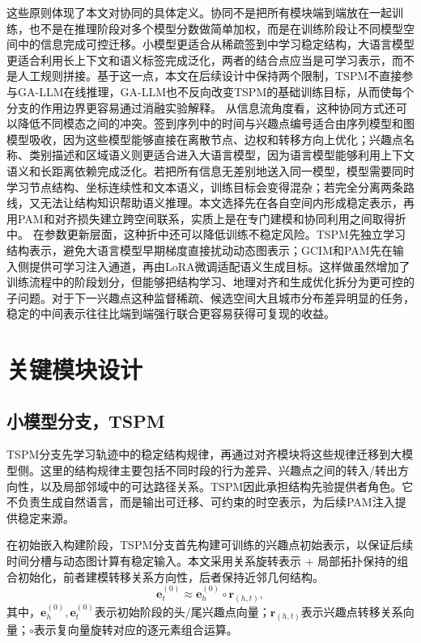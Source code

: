 \par\indent 这些原则体现了本文对协同的具体定义。协同不是把所有模块端到端放在一起训练，也不是在推理阶段对多个模型分数做简单加权，而是在训练阶段让不同模型空间中的信息完成可控迁移。小模型更适合从稀疏签到中学习稳定结构，大语言模型更适合利用长上下文和语义标签完成泛化，两者的结合点应当是可学习表示，而不是人工规则拼接。基于这一点，本文在后续设计中保持两个限制，TSPM不直接参与GA-LLM在线推理，GA-LLM也不反向改变TSPM的基础训练目标，从而使每个分支的作用边界更容易通过消融实验解释。
从信息流角度看，这种协同方式还可以降低不同模态之间的冲突。签到序列中的时间与兴趣点编号适合由序列模型和图模型吸收，因为这些模型能够直接在离散节点、边权和转移方向上优化；兴趣点名称、类别描述和区域语义则更适合进入大语言模型，因为语言模型能够利用上下文语义和长距离依赖完成泛化。若把所有信息无差别地送入同一模型，模型需要同时学习节点结构、坐标连续性和文本语义，训练目标会变得混杂；若完全分离两条路线，又无法让结构知识帮助语义推理。本文选择先在各自空间内形成稳定表示，再用PAM和对齐损失建立跨空间联系，实质上是在专门建模和协同利用之间取得折中。
在参数更新层面，这种折中还可以降低训练不稳定风险。TSPM先独立学习结构表示，避免大语言模型早期梯度直接扰动动态图表示；GCIM和PAM先在输入侧提供可学习注入通道，再由LoRA微调适配语义生成目标。这样做虽然增加了训练流程中的阶段划分，但能够把结构学习、地理对齐和生成优化拆分为更可控的子问题。对于下一兴趣点这种监督稀疏、候选空间大且城市分布差异明显的任务，稳定的中间表示往往比端到端强行联合更容易获得可复现的收益。

\section{关键模块设计}
\subsection{小模型分支，TSPM}
TSPM分支先学习轨迹中的稳定结构规律，再通过对齐模块将这些规律迁移到大模型侧。这里的结构规律主要包括不同时段的行为差异、兴趣点之间的转入/转出方向性，以及局部邻域中的可达路径关系。TSPM因此承担结构先验提供者角色。它不负责生成自然语言，而是输出可迁移、可约束的时空表示，为后续PAM注入提供稳定来源。

在初始嵌入构建阶段，TSPM分支首先构建可训练的兴趣点初始表示，以保证后续时间分槽与动态图计算有稳定输入。本文采用关系旋转表示 + 局部拓扑保持的组合初始化，前者建模转移关系方向性，后者保持近邻几何结构\cite{sun2019rotate,belkin2003laplacian}。
\begingroup
\setlength{\abovedisplayskip}{6pt}
\setlength{\belowdisplayskip}{6pt}
\setlength{\abovedisplayshortskip}{4pt}
\setlength{\belowdisplayshortskip}{4pt}
\begin{equation}
\mathbf{e}^{(0)}_{t}\approx \mathbf{e}^{(0)}_{h}\circ \mathbf{r}_{(h,t)},
\label{eq:c3-init-rotate}
\end{equation}
其中，$\mathbf{e}^{(0)}_{h},\mathbf{e}^{(0)}_{t}$表示初始阶段的头/尾兴趣点向量；$\mathbf{r}_{(h,t)}$表示兴趣点转移关系向量；$\circ$表示复向量旋转对应的逐元素组合运算。


